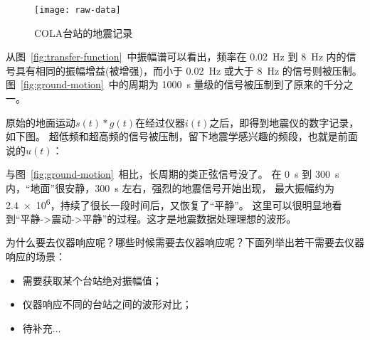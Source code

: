 \begin{figure}[H]
\centering
\texttt{[image: raw-data]}
\caption{COLA台站的地震记录}
\end{figure}

从图~\ref{fig:transfer-function}~中振幅谱可以看出，频率在 \SI{0.02}{\Hz}
到 \SI{8}{\Hz} 内的信号具有相同的振幅增益(被增强)，而小于 \SI{0.02}{\Hz}
或大于 \SI{8}{\Hz} 的信号则被压制。图~\ref{fig:ground-motion}~中的周期为
\SI{1000}{\s} 量级的信号被压制到了原来的千分之一。

原始的地面运动$s(t)*g(t)$在经过仪器$i(t)$之后，即得到地震仪的数字记录，如下图。
超低频和超高频的信号被压制，留下地震学感兴趣的频段，也就是前面说的$u(t)$：

与图~\ref{fig:ground-motion}~相比，长周期的类正弦信号没了。
在 \SI{0}{\s} 到 \SI{300}{\s} 内，``地面''很安静，\SI{300}{\s} 左右，强烈的地震信号开始出现，
最大振幅约为 \num{2.4e6}，持续了很长一段时间后，又恢复了``平静''。
这里可以很明显地看到``平静->震动->平静''的过程。这才是地震数据处理理想的波形。

为什么要去仪器响应呢？哪些时候需要去仪器响应呢？下面列举出若干需要去仪器响应的场景：
\begin{itemize}
\item 需要获取某个台站绝对振幅值；
\item 仪器响应不同的台站之间的波形对比；
\item 待补充...
\end{itemize}
